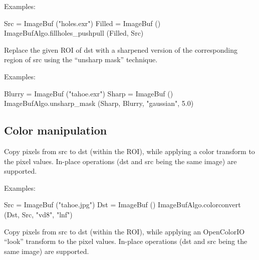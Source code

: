 \smallskip
\noindent Examples:
\begin{code}
    Src = ImageBuf ("holes.exr")
    Filled = ImageBuf ()
    ImageBufAlgo.fillholes_pushpull (Filled, Src)
\end{code}
\apiend


 

Replace the given ROI of {\cf dst} with a sharpened version of the
corresponding region of {\cf src} using the ``unsharp mask'' technique.

\smallskip
\noindent Examples:
\begin{code}
    Blurry = ImageBuf ("tahoe.exr")
    Sharp = ImageBuf ()
    ImageBufAlgo.unsharp_mask (Sharp, Blurry, "gaussian", 5.0)
\end{code}
\apiend



\subsection{Color manipulation}
\label{sec:iba:py:color}

 
Copy pixels from {\cf src} to {\cf dst} (within the ROI), while
applying a color transform to the pixel values.
In-place operations ({\cf dst} and {\cf src} being the same image)
are supported.

\smallskip
\noindent Examples:
\begin{code}
    Src = ImageBuf ("tahoe.jpg")
    Dst = ImageBuf ()
    ImageBufAlgo.colorconvert (Dst, Src, "vd8", "lnf")
\end{code}
\apiend


 
Copy pixels from {\cf src} to {\cf dst} (within the ROI), while
applying an OpenColorIO ``look'' transform to the pixel values.
In-place operations ({\cf dst} and {\cf src} being the same image)
are supported.


